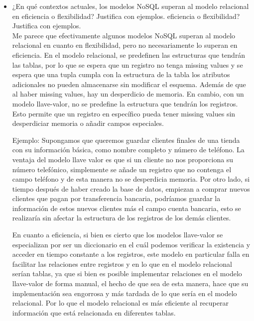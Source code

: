 \documentclass[12pt]{report}
\begin{document}
\begin{enumerate}[label=\textbf{\arabic*.}, leftmargin=*]
\begin{enumerate}[label=\textbf{\alph*.}, leftmargin=*, itemsep=1.0em]
\begin{itemize}
  \item ¿En qu\'e contextos actuales, los modelos NoSQL superan al modelo relacional en eficiencia o flexibilidad? Justifica con ejemplos.
  eficiencia o flexibilidad? Justifica con ejemplos.\\
    Me parece que efectivamente algunos modelos NoSQL superan al modelo relacional en cuanto en flexibilidad, pero no necesariamente lo superan en eficiencia.
    En el modelo relacional, se predefinen las estructuras que tendrán las tablas, por lo que se espera que un registro no tenga missing values y se espera que una tupla cumpla con la estructura de la tabla los atributos adicionales no pueden almacenarse sin modificar el esquema.
    Además de que al haber missing values, hay un desperdicio de memoria.
    En cambio, con un modelo llave-valor, no se predefine la estructura que tendrán los registros. Esto permite que un registro en específico pueda tener missing values sin desperdiciar memoria o añadir campos especiales.

    Ejemplo: Supongamos que queremos guardar clientes finales de una tienda con su información básica, como nombre completo y número de teléfono.
    La ventaja del modelo llave valor es que si un cliente no nos proporciona su número telefónico, simplemente se añade un registro que no contenga el campo teléfono y de esta manera no se desperdicia memoria.
    Por otro lado, si tiempo después de haber creado la base de datos, empiezan a comprar nuevos clientes que pagan por transferencia bancaria, podríamos guardar la información de estos nuevos clientes más el campo cuenta bancaria, esto se realizaría sin afectar la estructura de los registros de los demás clientes.

    En cuanto a eficiencia, si bien es cierto que los modelos llave-valor se especializan por ser un diccionario en el cuál podemos verificar la existencia y acceder en tiempo constante a los registros, este modelo en particular falla en facilitar las relaciones entre registros y en lo que en el modelo relacional serían tablas, ya que si bien es posible implementar relaciones en el modelo llave-valor de forma manual, el hecho de que sea de esta manera, hace que su implementación sea engorrosa y más tardada de lo que sería en el modelo relacional. Por lo que el modelo relacional es más eficiente al recuperar información que está relacionada en diferentes tablas.


\end{itemize}
\end{enumerate}
\end{enumerate}
\end{document}
